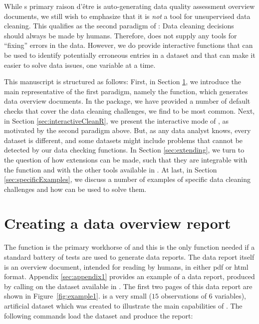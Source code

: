 \documentclass[article,shortnames]{jss}
\newcommand{\hl}[1]{\textcolor{magenta}{#1}}
\newcommand{\R}[1]{\code{#1}}
\begin{document}
While s primary raison d'être is auto-generating data
quality assessment overview documents, we still wish to emphasize that
it is \emph{not} a tool for unsupervised data cleaning. This qualifies
as the second paradigm of : Data cleaning decisions
should always be made by humans. Therefore,  does not
supply any tools for ``fixing'' errors in the data. However, we do
provide interactive functions that can be used to identify potentially
erroneous entries in a dataset and that can make it easier to solve
data issues, one variable at a time.


This manuscript is structured as follows: First, in Section
\ref{sec:usingdataMaid}, we introduce the main representative of the first
paradigm, namely the  function, which generates data
overview documents. In the  package, we have
provided a number of default checks that cover the data
cleaning challenges, we find to be most common. Next, in Section
\ref{sec:interactiveCleanR}, we present the interactive mode of , as motivated
by the second paradigm above. But, as any data analyst knows,
every dataset is different, and some datasets might include problems
that cannot be detected by our data checking functions. In Section
\ref{sec:extending}, we turn to the question of how  extensions
can be made, such that they are integrable with the 
function and with the other tools available in .  At last,
in Section \ref{sec:specificExamples}, we discuss a number of examples of
specific data cleaning challenges and how  can be used to
solve them.






\section{Creating a data overview report}
\label{sec:usingdataMaid}

The  function is the primary workhorse of  and
this is the only function needed if a standard battery
of tests are used to generate data reports. The data report itself is an overview document, intended for reading
by humans, in either pdf or html format. Appendix \ref{sec:appendix1}
provides an example of a data report, produced by
calling  on the dataset  available in
. The first two pages of this data report are
shown in Figure~\ref{fig:example1}.  is a very
small ($15$ observations of $6$ variables), artificial dataset which was created to
illustrate the main capabilities of . The following
commands load the dataset and produce the report:
\end{document}
